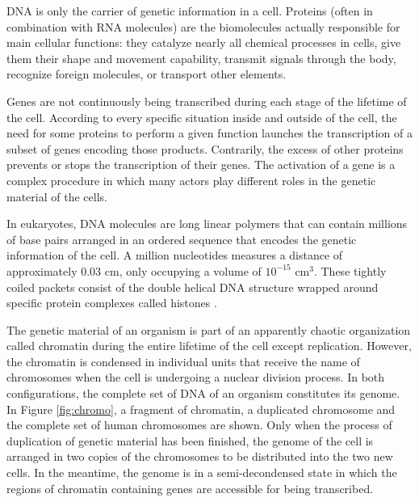 DNA is only the carrier of genetic information in a cell. Proteins
(often in combination with
RNA molecules) are the biomolecules actually responsible for main cellular functions: they catalyze 
nearly all chemical processes in cells, give them their shape and movement capability, transmit signals 
through the body, recognize foreign molecules, or transport other elements. 

Genes are not continuously being transcribed during each stage of the lifetime of the cell. According
to every specific situation inside and outside of the cell, the need for some proteins to perform
a given function launches the transcription of a subset of genes encoding those products. Contrarily,
the excess of other proteins prevents or stops the transcription of their genes. The activation of a 
gene is a complex procedure in which many actors play different roles in the genetic material of the 
cells.


In eukaryotes, DNA molecules are long linear polymers that can contain millions of base pairs
arranged in an ordered sequence that encodes the genetic information of the cell. A
million nucleotides measures a distance of approximately $0.03$ cm, only occupying a volume of 
$10^{-15}$ cm$^3$. These tightly coiled packets consist of the double helical DNA structure 
wrapped around specific protein complexes called histones \citep{alberts:1994a}.

The genetic material of an organism is part of an apparently chaotic organization called chromatin
during the entire lifetime of the cell except replication. However, the chromatin is condensed
in individual units that receive the name of chromosomes 
when the cell is undergoing a nuclear 
division process. In both configurations, the complete set of DNA of an organism constitutes 
its genome.   
In Figure \ref{fig:chromo}, a fragment of chromatin, a duplicated chromosome and the 
complete set of human chromosomes are shown. Only when the process of duplication of genetic material 
has been finished, the genome of the cell is arranged in two copies of the chromosomes to be distributed 
into the two new cells. In the meantime, the genome is in a semi-decondensed state in which the regions 
of chromatin containing genes are accessible for being transcribed.

